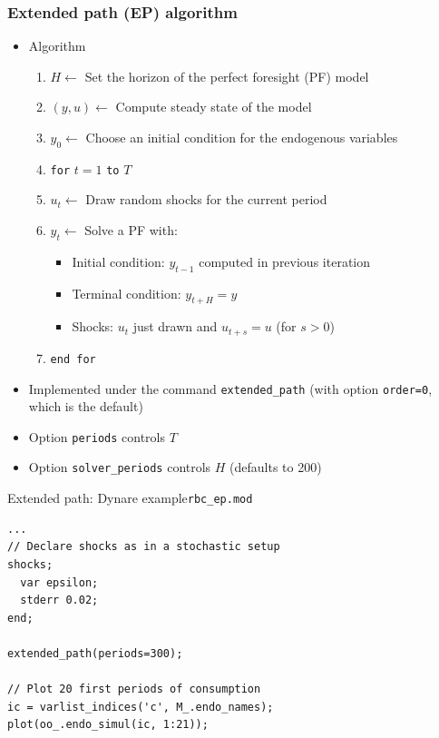 \documentclass[handout,usepdftitle=false,xcolor=dvipsnames,aspectratio=169]{beamer}
\begin{document}
\begin{frame}
  \frametitle{Extended path (EP) algorithm}
  \begin{itemize}

    \item Algorithm
          \begin{enumerate}
            \item $H \leftarrow$ Set the horizon of the perfect foresight (PF) model
            \item $(y, u) \leftarrow$ Compute steady state of the model
            \item $y_0 \leftarrow$ Choose an initial condition for the endogenous variables
            \item \texttt{for} $t=1$ \texttt{to} $T$
            \item \hspace{2mm} $u_t  \leftarrow$ Draw random shocks for the current period
            \item \hspace{2mm} $y_t \leftarrow$ Solve a PF with:
                  \begin{itemize}
                    \item Initial condition: $y_{t-1}$ computed in previous iteration
                    \item Terminal condition: $y_{t+H}=y$
                    \item Shocks: $u_t$ just drawn and $u_{t+s}=u$ (for $s>0$)
                  \end{itemize}
            \item \texttt{end for}
          \end{enumerate}

    \item Implemented under the command \texttt{extended\_path} (with option
          \texttt{order=0}, which is the default)
    \item Option \texttt{periods} controls $T$
    \item Option \texttt{solver\_periods} controls $H$ (defaults to 200)
  \end{itemize}
\end{frame}

\begin{frame}[fragile]{Extended path: Dynare example}{\texttt{rbc\_ep.mod}}
  \begin{verbatim}
...
// Declare shocks as in a stochastic setup
shocks;
  var epsilon;
  stderr 0.02;
end;

extended_path(periods=300);

// Plot 20 first periods of consumption
ic = varlist_indices('c', M_.endo_names);
plot(oo_.endo_simul(ic, 1:21));
\end{verbatim}
\end{frame}
\end{document}
